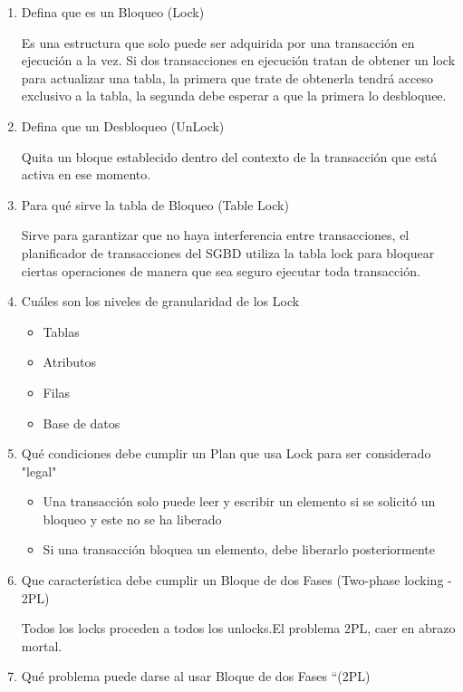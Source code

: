 \begin{enumerate}
\item Defina que es un Bloqueo (Lock)

Es una estructura que solo puede ser adquirida por una transacción en ejecución a la vez. Si dos transacciones en ejecución tratan de obtener un lock para actualizar una tabla, la primera que trate de obtenerla tendrá acceso exclusivo a la tabla, la segunda debe esperar a que la primera lo desbloquee.

\item Defina que un Desbloqueo (UnLock)

Quita un bloque establecido dentro del contexto de la transacción que está activa en ese momento.

\item Para qué sirve la tabla de Bloqueo (Table Lock)

Sirve para garantizar que no haya interferencia entre transacciones, el planificador de transacciones del SGBD utiliza la tabla lock para bloquear ciertas operaciones de manera que sea seguro ejecutar toda transacción.

\item Cuáles son los niveles de granularidad de los Lock

\begin{itemize}
\item Tablas
\item Atributos
\item Filas
\item Base de datos
\end{itemize}

\item Qué condiciones debe cumplir  un Plan que usa Lock para ser considerado "legal"

\begin{itemize}
\item Una transacción solo puede leer y escribir un elemento si se solicitó un bloqueo y este no se ha liberado
\item Si una transacción bloquea un elemento, debe liberarlo posteriormente
\end{itemize}

\item Que característica debe cumplir un Bloque de dos Fases (Two-phase locking - 2PL)

Todos los locks proceden a todos los unlocks.El problema 2PL, caer en abrazo mortal.

\item Qué problema puede darse al usar Bloque de dos Fases “(2PL)


\end{enumerate}

